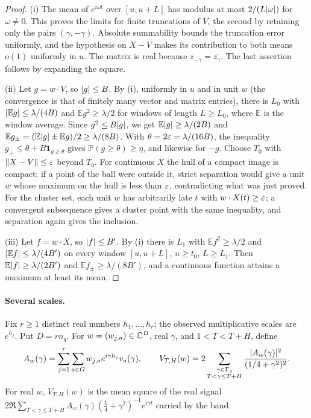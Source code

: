 \begin{proof}
(i) The mean of $e^{i\omega t}$ over $[u,u+L]$ has modulus at most $2/(L\lvert\omega\rvert)$ for
$\omega\ne0$. This proves the limits for finite truncations of $V$, the second by retaining
only the pairs $(\gamma,-\gamma)$. Absolute summability bounds the truncation error uniformly,
and the hypothesis on $X-V$ makes its contribution to both means $o(1)$ uniformly in $u$. The
matrix is real because $z_{-\gamma}=\overline{z_\gamma}$. The last assertion follows by
expanding the square.

(ii) Let $g=w\cdot V$, so $\lvert g\rvert\le B$. By (i), uniformly in $u$ and in unit $w$ (the
convergence is that of finitely many vector and matrix entries), there is $L_0$ with
$\lvert\mathbb E g\rvert\le\lambda/(4B)$ and $\mathbb Eg^2\ge\lambda/2$ for windows of length
$L\ge L_0$, where $\mathbb E$ is the window average. Since $g^2\le B\lvert g\rvert$, we get
$\mathbb E\lvert g\rvert\ge\lambda/(2B)$ and $\mathbb Eg_\pm=(\mathbb E\lvert g\rvert\pm\mathbb Eg)/2\ge\lambda/(8B)$.
With $\theta=2\varepsilon=\lambda/(16B)$, the inequality $g_+\le\theta+B\mathbf 1_{g\ge\theta}$ gives
$\mathbb P(g\ge\theta)\ge\eta$, and likewise for $-g$. Choose $T_0$ with $\lVert X-V\rVert\le\varepsilon$
beyond $T_0$. For continuous $X$ the hull of a compact image is compact; if a point of the
ball were outside it, strict separation would give a unit $w$ whose maximum on the hull is
less than $\varepsilon$, contradicting what was just proved. For the cluster set, each unit $w$ has
arbitrarily late $t$ with $w\cdot X(t)\ge\varepsilon$; a convergent subsequence gives a cluster point
with the same inequality, and separation again gives the inclusion.

(iii) Let $f=w\cdot X$, so $\lvert f\rvert\le B'$. By (i) there is $L_1$ with $\mathbb Ef^2\ge\lambda/2$
and $\lvert\mathbb Ef\rvert\le\lambda/(4B')$ on every window $[u,u+L]$, $u\ge t_0$, $L\ge L_1$. Then
$\mathbb E\lvert f\rvert\ge\lambda/(2B')$ and $\mathbb Ef_\pm\ge\lambda/(8B')$, and a continuous function
attains a maximum at least its mean.
\end{proof}

\paragraph{Several scales.}
Fix $r\ge1$ distinct real numbers $h_1,\dots,h_r$; the observed multiplicative scales are
$e^{h_j}$. Put $D=rn_q$. For $w=(w_{j,a})\in\mathbb{C}^D$, real $\gamma$, and $1<T<T+H$, define
\[
 A_w(\gamma)=\sum_{j=1}^r\sum_{a\in G}w_{j,a}e^{i\gamma h_j}v_a(\gamma),\qquad
 V_{T,H}(w)=2\sum_{\substack{\gamma\in\Gamma_q\\T<\gamma\le T+H}}
 \frac{\lvert A_w(\gamma)\rvert^2}{(1/4+\gamma^2)^2}.
\]
For real $w$, $V_{T,H}(w)$ is the mean square of the real signal
$2\Re\sum_{T<\gamma\le T+H}A_w(\gamma)(\tfrac14+\gamma^2)^{-1}e^{i\gamma t}$ carried by the band.

